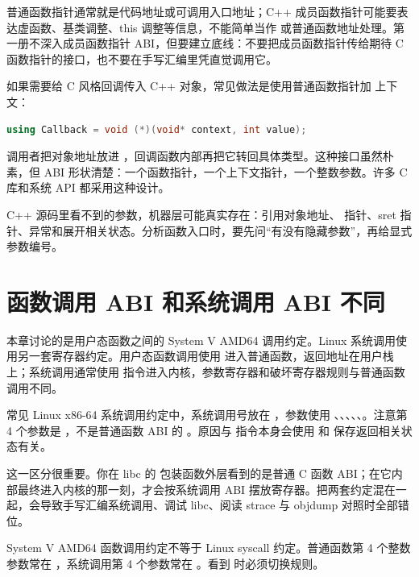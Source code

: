 普通函数指针通常就是代码地址或可调用入口地址；C++ 成员函数指针可能要表达虚函数、基类调整、this 调整等信息，不能简单当作  或普通函数地址处理。第一册不深入成员函数指针 ABI，但要建立底线：不要把成员函数指针传给期待 C 函数指针的接口，也不要在手写汇编里凭直觉调用它。

如果需要给 C 风格回调传入 C++ 对象，常见做法是使用普通函数指针加  上下文：

\begin{lstlisting}[language=C++]
using Callback = void (*)(void* context, int value);
\end{lstlisting}

调用者把对象地址放进 ，回调函数内部再把它转回具体类型。这种接口虽然朴素，但 ABI 形状清楚：一个函数指针，一个上下文指针，一个整数参数。许多 C 库和系统 API 都采用这种设计。

\begin{keyidea}
C++ 源码里看不到的参数，机器层可能真实存在：引用对象地址、 指针、sret 指针、异常和展开相关状态。分析函数入口时，要先问“有没有隐藏参数”，再给显式参数编号。
\end{keyidea}

\section{函数调用 ABI 和系统调用 ABI 不同}

本章讨论的是用户态函数之间的 System V AMD64 调用约定。Linux 系统调用使用另一套寄存器约定。用户态函数调用使用  进入普通函数，返回地址在用户栈上；系统调用通常使用  指令进入内核，参数寄存器和破坏寄存器规则与普通函数调用不同。

常见 Linux x86-64 系统调用约定中，系统调用号放在 ，参数使用 、、、、、。注意第 4 个参数是 ，不是普通函数 ABI 的 。原因与  指令本身会使用  和  保存返回相关状态有关。

这一区分很重要。你在 libc 的  包装函数外层看到的是普通 C 函数 ABI；在它内部最终进入内核的那一刻，才会按系统调用 ABI 摆放寄存器。把两套约定混在一起，会导致手写汇编系统调用、调试 libc、阅读 strace 与 objdump 对照时全部错位。

\begin{warningbox}
System V AMD64 函数调用约定不等于 Linux syscall 约定。普通函数第 4 个整数参数常在 ，系统调用第 4 个参数常在 。看到  时必须切换规则。
\end{warningbox}


